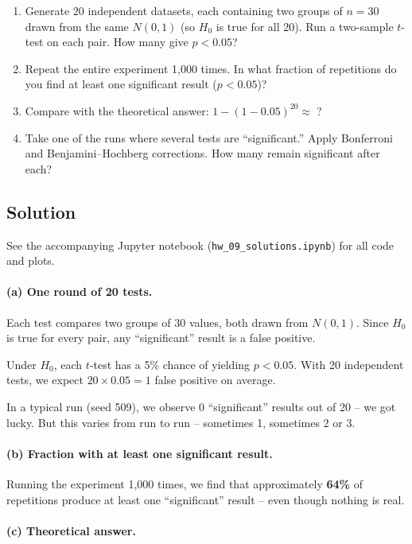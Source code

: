 \documentclass[11pt]{article}
\begin{document}
\begin{enumerate}[label=\alph*)]
  \item Generate 20 independent datasets, each containing two groups of $n = 30$ drawn from the same $N(0, 1)$ (so $H_0$ is true for all 20). Run a two-sample $t$-test on each pair. How many give $p < 0.05$?
  \item Repeat the entire experiment 1,000 times. In what fraction of repetitions do you find at least one significant result ($p < 0.05$)?
  \item Compare with the theoretical answer: $1 - (1 - 0.05)^{20} \approx\;$?
  \item Take one of the runs where several tests are ``significant.'' Apply Bonferroni and Benjamini--Hochberg corrections. How many remain significant after each?
\end{enumerate}

\subsection*{Solution}

See the accompanying Jupyter notebook (\texttt{hw\_09\_solutions.ipynb}) for all code and plots.

\paragraph{(a) One round of 20 tests.}

Each test compares two groups of 30 values, both drawn from $N(0,1)$. Since $H_0$ is true for every pair, any ``significant'' result is a false positive.

Under $H_0$, each $t$-test has a 5\% chance of yielding $p < 0.05$. With 20 independent tests, we expect $20 \times 0.05 = 1$ false positive on average.

In a typical run (seed 509), we observe 0 ``significant'' results out of 20 -- we got lucky. But this varies from run to run -- sometimes 1, sometimes 2 or 3.

\paragraph{(b) Fraction with at least one significant result.}

Running the experiment 1,000 times, we find that approximately \textbf{64\%} of repetitions produce at least one ``significant'' result -- even though nothing is real.

\paragraph{(c) Theoretical answer.}
\end{document}
